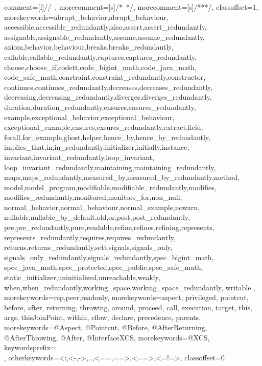        {%
        comment=[l]{//\ },
        morecomment=[s]{/*\ }{*/},
        morecomment=[s]{/**}{*/},
        classoffset=1,
        morekeywords={abrupt_behavior,abrupt_behaviour,
         accessible,accessible_redundantly,also,assert,assert_redundantly,
         assignable,assignable_redundantly,assume,assume_redundantly,
         axiom,behavior,behaviour,breaks,breaks_redundantly,
         callable,callable_redundantly,captures,captures_redundantly,
         choose,choose_if,codett,code_bigint_math,code_java_math,
         code_safe_math,constraint,constraint_redundantly,constructor,
         continues,continues_redundantly,decreases,decreases_redundantly,
         decreasing,decreasing_redundantly,diverges,diverges_redundantly,
         duration,duration_redundantly,ensures,ensures_redundantly,
         example,exceptional_behavior,exceptional_behaviour,
         exceptional_example,exsures,exsures_redundantly,extract,field,
         forall,for_example,ghost,helper,hence_by,hence_by_redundantly,
         implies_that,in,in_redundantly,initializer,initially,instance,
         invariant,invariant_redundantly,loop_invariant,
         loop_invariant_redundantly,maintaining,maintaining_redundantly,
         maps,maps_redundantly,measured_by,measured_by_redundantly,method,
         model,model_program,modifiable,modifiable_redundantly,modifies,
         modifies_redundantly,monitored,monitors_for,non_null,
         normal_behavior,normal_behaviour,normal_example,nowarn,
         nullable,nullable_by_default,old,or,post,post_redundantly,
         pre,pre_redundantly,pure,readable,refine,refines,refining,represents,
         represents_redundantly,requires,requires_redundantly,
         returns,returns_redundantly,sett,signals,signals_only,
         signals_only_redundantly,signals_redundantly,spec_bigint_math,
         spec_java_math,spec_protected,spec_public,spec_safe_math,
         static_initializer,uninitialized,unreachable,weakly,
         when,when_redundantly,working_space,working_space_redundantly,
         writable
        },
        morekeywords={rep,peer,readonly},
        morekeywords={aspect, privileged, pointcut, before, after, returning, throwing, around,
        proceed, call, execution, target, this, args, thisJoinPoint,
        within, cflow, declare, precedence, parents},
        morekeywords={@Aspect, @Pointcut, @Before, @AfterReturning, @AfterThrowing, @After, @InterfaceXCS},
        morekeywords={@XCS},
        keywordsprefix=\\,
        otherkeywords={<:,<-,->,..,<==,==>,<==>,<=!=>},
        classoffset=0 %
}
